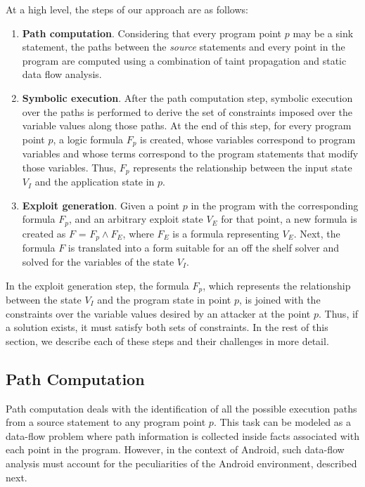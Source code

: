 At a high level, the steps of our approach are as follows:
\begin{enumerate}
	\item \textbf{Path computation}. Considering that every program point $p$ may be a sink statement, the paths between the \textit{source} statements and every point in the program are computed using a combination of taint propagation and static data flow analysis. 
	\item \textbf{Symbolic execution}. After the path computation step, symbolic execution over the paths is performed to derive the set of constraints imposed over the variable values along those paths. At the end of this step, for every program point $p$, a logic formula $F_p$ is created, whose variables correspond to program variables and whose terms correspond to the program statements that modify those variables. Thus, $F_p$ represents the relationship between the input state $V_I$ and the application state in $p$.
	\item \textbf{Exploit generation}. Given a point $p$ in the program with the corresponding formula $F_p$, and an arbitrary exploit state $V_E$ for that point, a new formula is created as $F$ = $F_p \wedge F_E$, where $F_E$ is a formula representing $V_E$. Next, the formula $F$ is translated into a form suitable for an off the shelf solver and solved for the variables of the state $V_I$. 
\end{enumerate}

In the exploit generation step, the formula $F_p$, which represents the relationship between the state $V_I$ and the program state in point $p$, is joined with the constraints over the variable values desired by an attacker at the point $p$. Thus, if a solution exists, it must satisfy both sets of constraints. In the rest of this section, we describe each of these steps and their challenges in more detail. 

\subsection{Path Computation}
Path computation deals with the identification of all the possible execution paths from a source statement to any program point $p$.  This task can be modeled as a data-flow problem where path information is collected inside facts associated with each point in the program. However, in the context of Android, such data-flow analysis must account for the peculiarities of the Android environment, described next.


